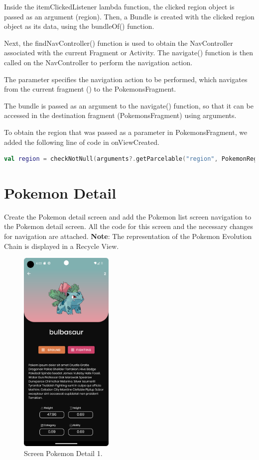 \documentclass[a4paper, 12pt]{article}
\begin{document}
Inside the itemClickedListener lambda function, the clicked region object is passed as an argument (region). 
Then, a Bundle is created with the clicked region object as its data, using the bundleOf() function.

Next, the findNavController() function is used to obtain the NavController associated with the current Fragment or Activity. 
The navigate() function is then called on the NavController to perform the navigation action.

The \textit{\texttt{}} parameter specifies the navigation action to be performed, 
which navigates from the current fragment (\textit{\texttt{}}) to the PokemonsFragment.

The bundle is passed as an argument to the navigate() function, so that it can be accessed in the destination fragment (PokemonsFragment) using arguments.

To obtain the region that was passed as a parameter in PokemonsFragment, we added the following line of code in onViewCreated.

\begin{lstlisting}[caption={Pokemons Fragment to suport navigation code.}, label={code:code_pokemons_fragment_nav}, language=Kotlin]
    val region = checkNotNull(arguments?.getParcelable("region", PokemonRegion::class.java))

\end{lstlisting}


\section{Pokemon Detail}

Create the Pokemon detail screen and add the Pokemon list screen navigation to the Pokemon detail screen. 
All the code for this screen and the necessary changes for navigation are attached.
\textbf{Note}: The representation of the Pokemon Evolution Chain is displayed in a Recycle View.

\begin{figure}
	\centering
	\includegraphics[height=10cm]{imgs/screens/screen_pokemon_detail_1.png}
	\caption{Screen Pokemon Detail 1.}
	\label{fig:screen_pk_detail_1}
\end{figure}
\end{document}
